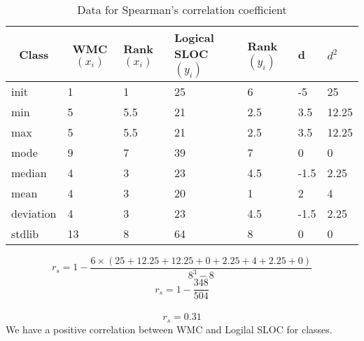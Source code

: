 \documentclass[12pt]{article}
\begin{document}
\begin{table}[h]
\centering
\begin{tabular}{|l|l|l|l|l|l|l|}
\hline
\multicolumn{1}{|c|}{\textbf{Class}} & \multicolumn{1}{c|}{\textbf{WMC$(x_{i})$}} & \textbf{Rank$(x_{i})$} & \textbf{Logical SLOC$(y_{i})$} & \textbf{Rank$(y_{i})$} & \textbf{d} & \textbf{$d^2$}\\ \hline
init      & 1  & 1   & 25 & 6   & -5 & 25\\ \hline
min       & 5  & 5.5 & 21 & 2.5 & 3.5 & 12.25\\ \hline
max       & 5  & 5.5 & 21 & 2.5 & 3.5 & 12.25\\ \hline
mode      & 9  & 7   & 39 & 7   & 0 & 0\\ \hline
median    & 4  & 3   & 23 & 4.5 & -1.5 & 2.25\\ \hline
mean      & 4  & 3   & 20 & 1   & 2 & 4\\ \hline
deviation & 4  & 3   & 23 & 4.5 &  -1.5 & 2.25\\ \hline
stdlib    & 13 & 8   & 64 & 8   &  0 & 0\\ \hline
\end{tabular}
\caption{Data for Spearman's correlation coefficient}
\end{table}

\begin{equation}
    r_{s} = 1-\frac{6\times(25+12.25+12.25+0+2.25+4+2.25+0)}{8^3-8}  
\end{equation}
\begin{equation}
    r_{s} = 1-\frac{348}{504}  
\end{equation}\\
\begin{equation}
    r_{s} = 0.31  
\end{equation}
We have a positive correlation between WMC and Logilal SLOC for classes.
\newpage
\end{document}
